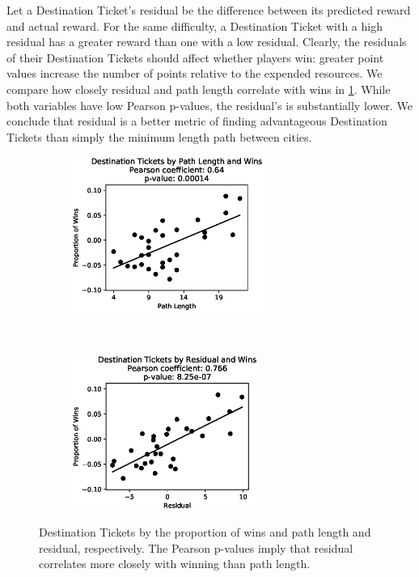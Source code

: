 Let a Destination Ticket's residual be the difference
between its predicted reward and actual reward.
For the same difficulty, a Destination Ticket
with a high residual has a greater reward
than one with a low residual.
Clearly, the residuals of their Destination Tickets
should affect whether players win: greater point values
increase the number of points relative to the expended
resources.
We compare how closely residual and path length
correlate with wins in \cref{fig:correlation}.
While both variables have low Pearson p-values,
the residual's is substantially lower.
We conclude that residual is a better metric
of finding advantageous Destination Tickets
than simply the minimum length path between
cities.

\begin{figure}[H]
    \centering
    \begin{subfigure}[t]{0.5\textwidth}
        \centering
        \includegraphics[height=2in]{figures/correlation0}
    \end{subfigure}%
    ~ 
    \begin{subfigure}[t]{0.5\textwidth}
        \centering
        \includegraphics[height=2in]{figures/correlation2}
    \end{subfigure}%
    \caption{Destination Tickets by the proportion of wins
    and path length and residual, respectively.
    The Pearson p-values imply that residual
    correlates more closely with winning than
    path length.}
    \label{fig:correlation}
\end{figure}


